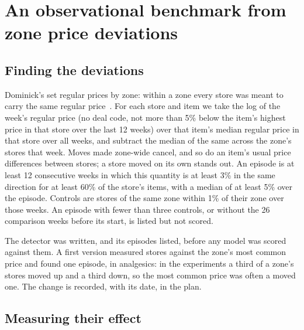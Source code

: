 \section{An observational benchmark from zone price deviations}
\label{sec:zones}

\subsection{Finding the deviations}

Dominick's set regular prices by zone: within a zone every store was meant to
carry the same regular price~\cite{dominicks}. For each store and item we take
the log of the week's regular price (no deal code, not more than 5\% below the
item's highest price in that store over the last 12 weeks) over that item's
median regular price in that store over all weeks, and subtract the median of
the same across the zone's stores that week. Moves made zone-wide cancel, and
so do an item's usual price differences between stores; a store moved on its
own stands out. An episode is at least 12 consecutive weeks in which this
quantity is at least 3\% in the same direction for at least 60\% of the store's
items, with a median of at least 5\% over the episode. Controls are stores of
the same zone within 1\% of their zone over those weeks. An episode with fewer
than three controls, or without the 26 comparison weeks before its start, is
listed but not scored.

The detector was written, and its episodes listed, before any model was scored
against them. A first version measured stores against the zone's most common
price and found one episode, in analgesics: in the experiments a third of a
zone's stores moved up and a third down, so the most common price was often a
moved one. The change is recorded, with its date, in the plan.

\subsection{Measuring their effect}


